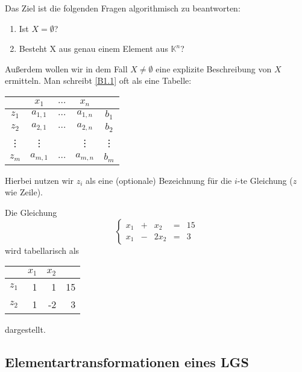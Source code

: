\begin{appendices}
Das Ziel ist die folgenden Fragen algorithmisch zu beantworten:
\begin{enumerate}
	\item
		Ist $ X = \emptyset $?
	\item
		Besteht X aus genau einem Element aus $ \mathbb{K}^n $?
\end{enumerate}
Außerdem wollen wir in dem Fall $ X \neq \emptyset $ eine explizite Beschreibung von $ X $ ermitteln. Man schreibt \eqref{B1.1} oft als eine Tabelle:
\begin{center}
\begin{tabular}{c|ccc|c}
	& $ x_1 $ & $ \ldots $ & $ x_n $ & \\
	\hline
	$ z_1 $ & $ a_{1,1} $ & $ \ldots $ & $ a_{1,n} $ & $ b_1 $ \\
	$ z_2 $ & $ a_{2,1} $ & $ \ldots $ & $ a_{2,n} $ & $ b_2 $ \\
	\vdots & \vdots &  & \vdots & \vdots \\
	$ z_m $ & $ a_{m,1} $ & $ \ldots $ & $ a_{m,n} $ & $ b_m $ \\
	\hline
\end{tabular}
\end{center}
Hierbei nutzen wir $ z_i $ als eine (optionale) Bezeichnung für die $ i $-te Gleichung ($ z $ wie Zeile). 

\begin{bsp}
	Die Gleichung 
	\[
		 \left\{ \begin{array}{rcrcr}
		x_1 &+& x_2 &=& 15\\
		x_1 &-& 2x_2 &=& 3
	\end{array} \right. 
	\]
	wird tabellarisch als 
	\begin{center}
	\begin{tabular}{r|rr|r}
		& $ x_1 $ & $ x_2 $ & \\
		\hline
		$ z_1 $ & 1 & 1 & 15 \\
		$ z_2 $ & 1 & -2 & 3 \\
		\hline
	\end{tabular}
	\end{center} 
	dargestellt. 
\end{bsp}
 
\subsection{Elementartransformationen eines LGS}


\end{appendices}
